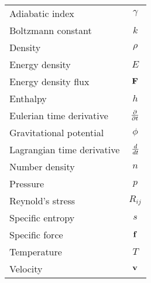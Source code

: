 \documentclass[../ay202_class_notes.tex]{subfiles}
\begin{document}
\renewcommand{\arraystretch}{1.3}
\renewcommand{\tabcolsep}{2pt}

\begin{tabular*}{\textwidth}{p{5cm} c }
Adiabatic index \dotfill & $\gamma$ \\
Boltzmann constant \dotfill & $k$ \\
Density \dotfill & $\rho$ \\ 
Energy density \dotfill & $E$ \\
Energy density flux \dotfill & $\mathbf{F}$ \\
Enthalpy \dotfill & $h$ \\
Eulerian time derivative \dotfill & $\frac{\partial }{\partial t}$ \\
Gravitational potential \dotfill & $\phi$ \\
Lagrangian time derivative \dotfill & $\frac{d }{d t}$ \\
Number density \dotfill & $n$ \\
Pressure \dotfill & $p$ \\
Reynold's stress \dotfill & $R_{ij}$ \\
Specific entropy \dotfill & $s$ \\
Specific force \dotfill & $\mathbf{f}$ \\
Temperature \dotfill & $T$ \\
Velocity \dotfill & $\mathbf{v}$  \\
\end{tabular*}
\end{document}
